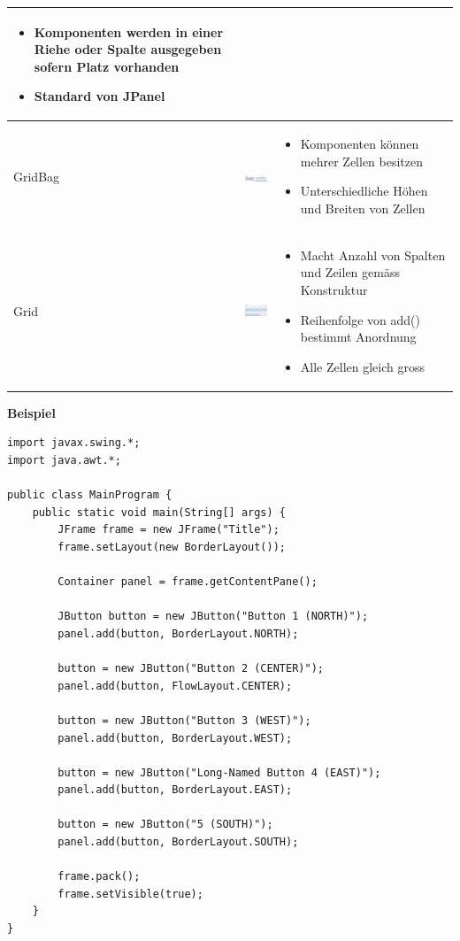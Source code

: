 \begin{tabular}{m{1cm} m{100px} m{4cm}}
\begin{itemize}[nosep]
		\item Komponenten werden in einer Riehe oder Spalte ausgegeben sofern Platz vorhanden
		\item Standard von JPanel
	\end{itemize} \\\midrule
	GridBag & \includegraphics[width=100px]{Images/girdbag} & \begin{itemize}[nosep]
		\item Komponenten können mehrer Zellen besitzen
		\item Unterschiedliche Höhen und Breiten von Zellen
	\end{itemize} \\\midrule
	Grid & \includegraphics[width=100px]{Images/gridlayout} & \begin{itemize}[nosep]
		\item Macht Anzahl von Spalten und Zeilen gemäss Konstruktur
		\item Reihenfolge von add() bestimmt Anordnung
		\item Alle Zellen gleich gross
	\end{itemize} \\\midrule
		
\end{tabular}
	
\textbf{Beispiel}
\begin{lstlisting}
import javax.swing.*;
import java.awt.*;

public class MainProgram {
	public static void main(String[] args) {
		JFrame frame = new JFrame("Title");
		frame.setLayout(new BorderLayout());
		
		Container panel = frame.getContentPane();
		
		JButton button = new JButton("Button 1 (NORTH)");
		panel.add(button, BorderLayout.NORTH);
		
		button = new JButton("Button 2 (CENTER)");
		panel.add(button, FlowLayout.CENTER);
		
		button = new JButton("Button 3 (WEST)");
		panel.add(button, BorderLayout.WEST);
		
		button = new JButton("Long-Named Button 4 (EAST)");
		panel.add(button, BorderLayout.EAST);
		
		button = new JButton("5 (SOUTH)");
		panel.add(button, BorderLayout.SOUTH);
			
		frame.pack();
		frame.setVisible(true);
	}
}
\end{lstlisting}

